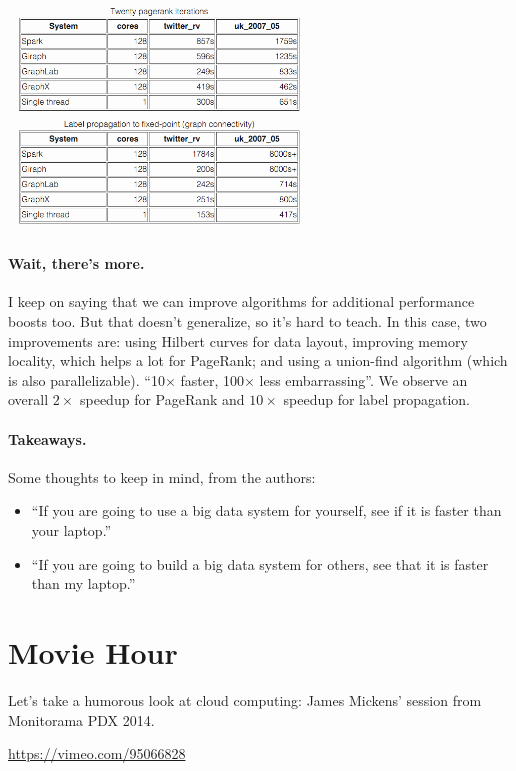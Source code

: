 \documentclass[a4paper]{report}
\begin{document}
\begin{center}
	\includegraphics[width=0.60\textwidth]{images/pagerank.png}
\end{center}

\paragraph{Wait, there's more.} I keep on saying that we can improve algorithms for additional performance boosts too.
But that doesn't generalize, so it's hard to teach. In this case, two improvements are: using Hilbert curves
for data layout, improving memory locality, which helps a lot for PageRank; and using a union-find algorithm 
(which is also parallelizable). ``10$\times$ faster, 100$\times$ less embarrassing''.  We observe an overall
$2\times$ speedup for PageRank and $10\times$ speedup for label propagation.

\paragraph{Takeaways.} Some thoughts to keep in mind, from the authors:
\begin{itemize}
\item    ``If you are going to use a big data system for yourself, see if it is faster than your laptop.''
\item    ``If you are going to build a big data system for others, see that it is faster than my laptop.''
\end{itemize}



\section*{Movie Hour}
Let's take a humorous look at cloud computing: James Mickens' session from Monitorama PDX 2014. 

\begin{center}
\url{https://vimeo.com/95066828}
\end{center}
\end{document}
